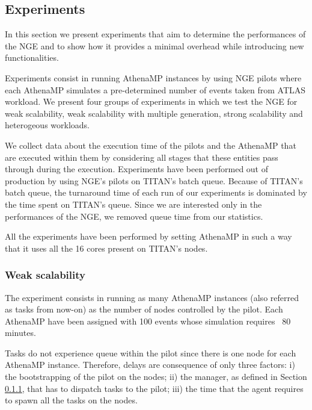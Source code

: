 
\subsection{Experiments}

In this section we present experiments that aim to determine the performances of the NGE and to show how it provides a minimal overhead while introducing new functionalities.

Experiments consist in running AthenaMP instances by using NGE pilots where each AthenaMP simulates a pre-determined number of events taken from ATLAS workload.	
We present four groups of experiments in which we test the NGE for weak scalability, weak scalability with multiple generation, strong scalability and heterogeous workloads.

We collect data about the execution time of the pilots and the AthenaMP that are executed within them by considering all stages that these entities pass through during the execution.
Experiments have been performed out of production by using NGE's pilots on TITAN's batch queue. 
Because of TITAN's batch queue, the turnaround time of each run of our experiments is dominated by the time spent on TITAN's queue. Since we are interested only in the performances of the NGE, we removed queue time from our statistics.

All the experiments have been performed by setting AthenaMP in such a way that it uses all the 16 cores present on TITAN's nodes. 


\subsubsection{Weak scalability}

The experiment consists in running as many AthenaMP instances (also referred as tasks from now-on) as the number of nodes controlled by the pilot. Each AthenaMP have been assigned with 100 events whose simulation requires  ~$80$ minutes. 
 
Tasks do not experience queue within the pilot since there is one node for each AthenaMP instance. Therefore, delays are consequence of only three factors: i) the bootstrapping of the pilot on the nodes; ii) the manager, as defined in Section \ref{}, that has to dispatch tasks to the pilot; iii) the time that the agent requires to spawn all the tasks on the nodes.

